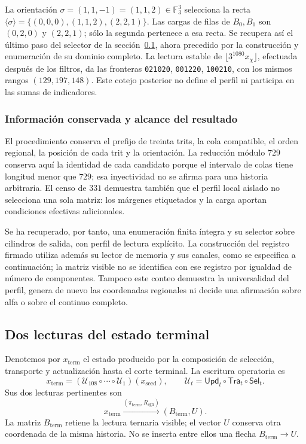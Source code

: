 La orientación \(\sigma=(1,1,-1)=(1,1,2)\in\mathbb F_3^3\)
selecciona la recta
\(\langle\sigma\rangle=\{(0,0,0),(1,1,2),(2,2,1)\}\).
Las cargas de filas de \(B_0,B_1\) son \((0,2,0)\) y \((2,2,1)\);
sólo la segunda pertenece a esa recta. Se recupera así el último paso
del selector de la sección~\ref{x_reciprocidad:subsec:k-terminal}, ahora precedido por
la construcción y enumeración de su dominio completo. La lectura estable
de \(\lfloor3^{1080}x_\chi\rfloor\), efectuada después de los filtros,
da las fronteras \texttt{021020}, \texttt{001220}, \texttt{100210},
con los mismos rangos \((129,197,148)\). Este cotejo posterior no define
el perfil ni participa en las sumas de indicadores.

\subsubsection{Información conservada y alcance del resultado}

El procedimiento conserva el prefijo de treinta trits, la cola compatible,
el orden regional, la posición de cada trit y la orientación. La reducción
módulo \(729\) conserva aquí la identidad de cada candidato porque el
intervalo de colas tiene longitud menor que \(729\); esa inyectividad
no se afirma para una historia arbitraria. El censo de \(331\) demuestra
también que el perfil local aislado no selecciona una sola matriz: los
márgenes etiquetados y la carga aportan condiciones efectivas adicionales.

Se ha recuperado, por tanto, una enumeración finita íntegra y su selector
sobre cilindros de salida, con perfil de lectura explícito. La construcción
del registro firmado utiliza además su lector de memoria y sus canales,
como se especifica a continuación; la matriz visible no se identifica con
ese registro por igualdad de número de componentes. Tampoco este conteo
demuestra la universalidad del perfil, genera de nuevo las coordenadas
regionales ni decide una afirmación sobre alfa o sobre el continuo completo.



\subsection{Dos lecturas del estado terminal}
\label{x_reciprocidad:subsec:k-terminal}

Denotemos por \(x_{\mathrm{term}}\) el estado producido por la composición
de selección, transporte y actualización hasta el corte terminal. La
escritura operatoria es
\[
 x_{\mathrm{term}}=
 (\mathcal U_{108}\circ\cdots\circ\mathcal U_1)(x_{\mathrm{seed}}),
 \qquad \mathcal U_t=\mathsf{Upd}_t\circ\mathsf{Tra}_t\circ\mathsf{Sel}_t.
\]
Sus dos lecturas pertinentes son
\[
 x_{\mathrm{term}}
 \xrightarrow{(\pi_{\mathrm{term}},R_{\mathrm{sgn}})}
 (B_{\mathrm{term}},U).
\]
La matriz \(B_{\mathrm{term}}\) retiene la lectura ternaria visible; el
vector \(U\) conserva otra coordenada de la misma historia. No se inserta
entre ellos una flecha \(B_{\mathrm{term}}\to U\).

